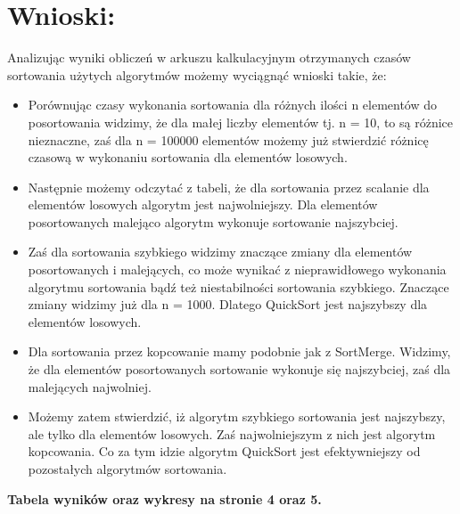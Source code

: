 \documentclass{article}
\begin{document}
\section{Wnioski:}
Analizując wyniki obliczeń w arkuszu kalkulacyjnym otrzymanych czasów sortowania użytych algorytmów możemy wyciągnąć wnioski takie, że:
\begin{itemize}
    \item Porównując czasy wykonania sortowania dla różnych ilości n elementów do posortowania widzimy, że dla małej liczby elementów tj. n = 10, to są różnice nieznaczne, zaś dla n = 100000 elementów możemy już stwierdzić różnicę czasową w wykonaniu sortowania dla elementów losowych.
  \item Następnie możemy odczytać z tabeli, że dla sortowania przez scalanie dla elementów losowych algorytm jest najwolniejszy. Dla elementów posortowanych malejąco algorytm wykonuje sortowanie najszybciej.
  \item Zaś dla sortowania szybkiego widzimy znaczące zmiany dla elementów posortowanych i malejących, co może wynikać z nieprawidłowego wykonania algorytmu sortowania bądź też niestabilności sortowania szybkiego. Znaczące zmiany widzimy już dla n = 1000. Dlatego QuickSort jest najszybszy dla elementów losowych.
  \item Dla sortowania przez kopcowanie mamy podobnie jak z SortMerge. Widzimy, że dla elementów posortowanych sortowanie wykonuje się najszybciej, zaś dla malejących najwolniej.
  \item Możemy zatem stwierdzić, iż algorytm szybkiego sortowania jest najszybszy, ale tylko dla elementów losowych. Zaś najwolniejszym z nich jest algorytm kopcowania. Co za tym idzie algorytm QuickSort jest efektywniejszy od pozostałych algorytmów sortowania.
\end{itemize}
\textbf{Tabela wyników oraz wykresy na stronie 4 oraz 5.}
\end{document}
